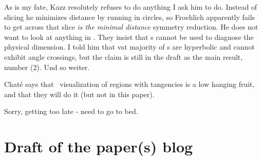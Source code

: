 \begin{description}
As is my fate, Kazz resolutely refuses to do anything I ask him to do.
Instead of slicing he minimizes distance by running in circles, so
Froehlich apparently fails to get across that slice \emph{is
the minimal distance} symmetry reduction. He does not want to look at anything in
\statesp. They insist that \po s cannot be used to diagnose the physical dimension.
I told him that vat majority of \po s are hyperbolic and cannot exhibit angle crossings,
but the claim is still in the draft as the main result, number (2). Und so weiter.

Chat\'e says that \statesp\ visualization of regions with tangencies is a
low hanging fruit, and that they will do it (but not in this paper).

Sorry, getting too late - need to go to bed.

\end{description}


\newpage
\section{Draft of the paper(s) blog}
\label{sect:DraftBlog}

